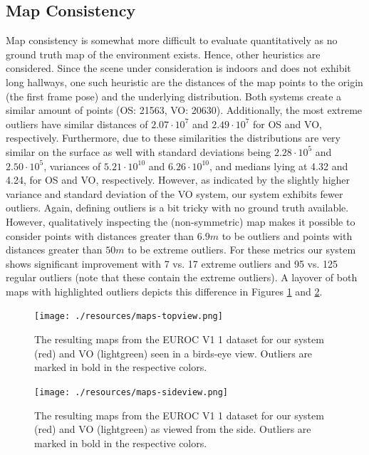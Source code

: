 \documentclass[a4paper, 10pt]{article}
\begin{document}
\subsection{Map Consistency}
\label{sec:org29d5359}

Map consistency is somewhat more difficult to evaluate quantitatively as no ground truth map of the environment exists. 
Hence, other heuristics are considered. Since the scene under consideration is indoors and does not exhibit long hallways, one such heuristic are the distances of the map points 
to the origin (the first frame pose) and the underlying distribution. Both systems create a similar amount of points (OS: 21563, VO: 20630). 
Additionally, the most extreme outliers have similar distances of \(2.07 \cdot 10^7\) and \(2.49 \cdot 10^7\) for OS and VO, respectively. Furthermore, due to these similarities the distributions are very similar on the
surface as well with standard deviations being \(2.28 \cdot 10^5\) and \(2.50 \cdot 10^5\), variances of \(5.21 \cdot 10^{10}\) and \(6.26 \cdot 10^{10}\), and medians lying at 4.32 and 4.24, for OS and VO, respectively.
However, as indicated by the slightly higher variance and standard deviation of the VO system, our system exhibits fewer outliers. Again, defining outliers is a bit tricky with no ground truth available. However,
qualitatively inspecting the (non-symmetric) map makes it possible to consider points with distances greater than \(6.9m\) to be outliers and points with distances greater than \(50m\) to be extreme outliers. For these metrics
our system shows significant improvement with 7 vs. 17 extreme outliers and 95 vs. 125 regular outliers (note that these contain the extreme outliers).
A layover of both maps with highlighted outliers depicts this difference in Figures \ref{fig:orgbe7c521} and \ref{fig:org5ed7aad}.
\begin{figure}[htbp]
\centering
\texttt{[image: ./resources/maps-topview.png]}
\caption{\label{fig:orgbe7c521}
The resulting maps from the EUROC V1 1 dataset for our system (red) and VO (lightgreen) seen in a birds-eye view. Outliers are marked in bold in the respective colors.}
\end{figure}

\begin{figure}[htbp]
\centering
\texttt{[image: ./resources/maps-sideview.png]}
\caption{\label{fig:org5ed7aad}
The resulting maps from the EUROC V1 1 dataset for our system (red) and VO (lightgreen) as viewed from the side. Outliers are marked in bold in the respective colors.}
\end{figure}
\end{document}
